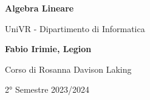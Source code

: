 \begin{titlepage}
	\begin{center}
		\vspace*{1cm}

		\Huge
		\textbf{Algebra Lineare}

		\vspace{0.5cm}
		\LARGE
		UniVR - Dipartimento di Informatica

		\vspace{1.5cm}

		\textbf{Fabio Irimie, Legion}

		\vfill


		\vspace{0.8cm}

    Corso di Rosanna Davison Laking

		2° Semestre 2023/2024

	\end{center}
\end{titlepage}
